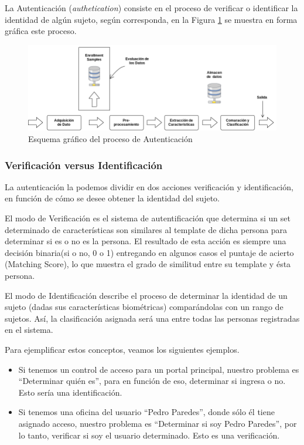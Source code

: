 
La Autenticación (\textit{authetication}) consiste en el proceso de verificar o identificar la identidad de algún sujeto, según corresponda,  en la Figura \ref{autenticacion} se muestra en forma gráfica este proceso.

\begin{figure}[H]
\centering
\includegraphics[scale=0.5]{images/capitulo2/autenticacion.png}
\caption{Esquema gráfico del proceso  de Autenticación}
\label{autenticacion}
\end{figure}


\subsubsection{Verificación versus Identificación}

La autenticación la podemos dividir en dos acciones verificación y identificación, en función de cómo se desee obtener la identidad del sujeto.

El modo de Verificación es el sistema de autentificación que determina si un set determinado de características son similares al template de dicha persona para determinar si es o no es la persona. El resultado de esta acción es siempre una decisión binaria(si o no, 0 o 1) entregando en algunos casos el puntaje de acierto (Matching Score), lo que muestra el grado de similitud entre su template y ésta persona.


El modo de Identificación describe el proceso de determinar la identidad de un sujeto (dadas sus características biométricas) comparándolas con un rango de sujetos. Así, la clasificación asignada será una entre todas las personas registradas en el sistema.



Para ejemplificar estos conceptos, veamos los siguientes ejemplos.

\begin{itemize}

\item Si tenemos un control de acceso para un portal principal, nuestro problema es ``Determinar quién es'', para en función de eso, determinar si ingresa o no. Esto sería una identificación.

\item Si tenemos una oficina del usuario ``Pedro Paredes'', donde sólo él tiene asignado acceso, nuestro problema es ``Determinar si soy Pedro Paredes'', por lo tanto, verificar si soy el usuario determinado. Esto es una verificación.
\end{itemize}

